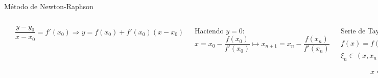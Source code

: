 \documentclass[9pt, aspectratio=169]{beamer}
\begin{document}
\begin{frame}{Método de Newton-Raphson}
  \begin{columns}[c]
    \cx
    \begin{overprint}
       \includegraphics{figs/newton-01.pdf}
       \includegraphics{figs/newton-02.pdf}
    \end{overprint}

    \cx
    \[ \frac{y - y_0}{x - x_0} = f'(x_0) \Rightarrow  y = f(x_0) + f'(x_0) (x - x_0) \]

    Haciendo $y = 0$:
    \[x = x_0 - \frac{f(x_0)}{f'(x_0)} \mapsto  x_{n+1} = x_{n} - \frac{f(x_n)}{f'(x_n)}\]
    \pause

    \begin{overprint}
       {
        Serie de Taylor ($x_n \approx x*$):
        \[f(x) = f(x_n) + (x - x_n) f'(x_n) + \frac{1}{2} (x - x_n)^2 f''(\xi) \]
        $\xi_n \in (x, x_n)$ Hacemos $f(x) = 0$:
        \[ x = x_n - \frac{f(x_n)}{f'(x_n)} - \frac{1}{2} (x - x_n)^2 \frac{f''(\xi_n)}{f'(x_n)} \]
        \[ \mapsto x_{n+1} = x_n - \frac{f(x_n)}{f'(x_n)'} \]
      }
    \end{overprint}
  \end{columns}
\end{frame}
\end{document}
